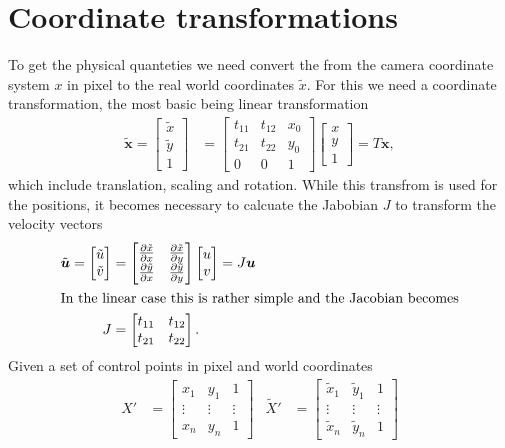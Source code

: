 \documentclass[10pt]{article}
\renewcommand{\vec}[1]{\ensuremath{\boldsymbol #1}}
\newcommand{\pder}[2][]{\ensuremath{\frac{\partial{#1}}{\partial{#2}}}}
\begin{document}
\section{Coordinate transformations}
To get the physical quanteties we need convert the from the camera coordinate system $x$ in pixel 
to the real world coordinates $\tilde x$.
For this we need a coordinate transformation, the most basic being linear transformation
  \begin{align}
	 \label{eq:lin}
	 \tilde{\vec x} = \begin{bmatrix}\tilde x\\\tilde y\\1\end{bmatrix} &= 
	 \begin{bmatrix} t_{11} & t_{12} & x_0\\ t_{21} & t_{22} & y_0 \\ 0 & 0 & 1\end{bmatrix}
	 \begin{bmatrix}x\\y\\1\end{bmatrix} = T\vec x,
  \end{align}
which include translation, scaling and rotation.
While this transfrom is used for the positions, it becomes necessary to calcuate the Jabobian $J$ to transform the velocity vectors
  \begin{align}
	 \tilde{\vec u} =
	 \begin{bmatrix}\tilde u\\\tilde v\end{bmatrix} &= 
	 \begin{bmatrix}\pder[\tilde x]{x} & \pder[\tilde x]{y}\\ \pder[\tilde y]{x}& \pder[\tilde y]{y} \end{bmatrix}
	 \begin{bmatrix}u\\v\end{bmatrix} = J\vec u \\
\intertext{In the linear case this is rather simple and the Jacobian becomes}
	 J &= \begin{bmatrix} t_{11} & t_{12} \\ t_{21} & t_{22}\end{bmatrix}. 
  \end{align}
%
  Given a set of control points in pixel and world coordinates   
  \begin{align}
	 X' &= \begin{bmatrix}
		x_1 & y_1 & 1\\
	\vdots & \vdots & \vdots \\
	  x_n & y_n & 1 
	 \end{bmatrix} &  
	 {\tilde X}' &= \begin{bmatrix}
		 \tilde x_1 & \tilde y_1 & 1\\
	\vdots & \vdots & \vdots \\
	 \tilde x_n & \tilde y_n & 1
	 \end{bmatrix} 
  \end{align}
\end{document}
